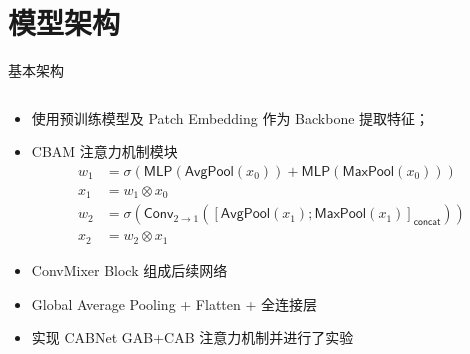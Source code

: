 \documentclass[9pt, aspectratio=1610]{beamer}
\begin{document}
\section{模型架构}
    \begin{frame}{基本架构}
    \begin{columns}
        
    \begin{column}{0.7\textwidth}
    \begin{itemize}
        \item 使用预训练模型及 Patch Embedding 作为 Backbone 提取特征；
        \item CBAM 注意力机制模块\cite{woo2018}
            $$
            \begin{aligned}
                w_1 &=\sigma(\mathsf{MLP}(\mathsf{AvgPool}(x_0))+ \mathsf{MLP}(\mathsf{MaxPool}(x_0)))\\
                x_1 &= w_1 \otimes x_0\\
                w_2 &=\sigma(\mathsf{Conv}_{2\rightarrow 1}([\mathsf{AvgPool}(x_1); \mathsf{MaxPool}(x_1)]_{\mathsf{concat}}))\\
                x_2 &= w_2 \otimes x_1
            \end{aligned}
            $$
        \item ConvMixer Block\cite{trockman2022} 组成后续网络
        \item Global Average Pooling + Flatten + 全连接层
        \item 实现 CABNet GAB+CAB 注意力机制并进行了实验

    \end{itemize}


\end{column}
\end{columns}
\end{frame}
\end{document}
